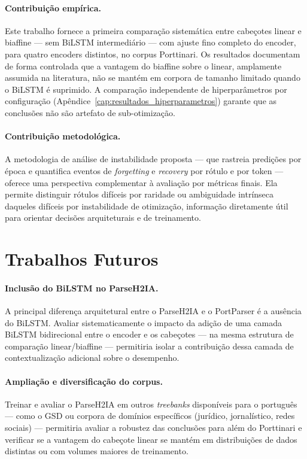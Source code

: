 \paragraph{Contribuição empírica.} Este trabalho fornece a primeira comparação sistemática
entre cabeçotes linear e biaffine — sem BiLSTM intermediário — com ajuste fino completo do
encoder, para quatro encoders distintos, no corpus Porttinari. Os resultados documentam de
forma controlada que a vantagem do biaffine sobre o linear, amplamente assumida na literatura,
não se mantém em corpora de tamanho limitado quando o BiLSTM é suprimido. A comparação
independente de hiperparâmetros por configuração (Apêndice~\ref{cap:resultados_hiperparametros})
garante que as conclusões não são artefato de sub-otimização.

\paragraph{Contribuição metodológica.} A metodologia de análise de instabilidade proposta —
que rastreia predições por época e quantifica eventos de \textit{forgetting} e
\textit{recovery} por rótulo e por token — oferece uma perspectiva complementar à avaliação
por métricas finais. Ela permite distinguir rótulos difíceis por raridade ou ambiguidade
intrínseca daqueles difíceis por instabilidade de otimização, informação diretamente útil
para orientar decisões arquiteturais e de treinamento.

\section{Trabalhos Futuros}
\label{sec:trabalhos_futuros}

\paragraph{Inclusão do BiLSTM no ParseH2IA.} A principal diferença arquitetural entre o
ParseH2IA e o PortParser é a ausência do BiLSTM. Avaliar sistematicamente o impacto da
adição de uma camada BiLSTM bidirecional entre o encoder e os cabeçotes — na mesma estrutura
de comparação linear/biaffine — permitiria isolar a contribuição dessa camada de
contextualização adicional sobre o desempenho.

\paragraph{Ampliação e diversificação do corpus.} Treinar e avaliar o ParseH2IA em outros
\textit{treebanks} disponíveis para o português — como o GSD ou corpora de domínios
específicos (jurídico, jornalístico, redes sociais) — permitiria avaliar a robustez das
conclusões para além do Porttinari e verificar se a vantagem do cabeçote linear se mantém
em distribuições de dados distintas ou com volumes maiores de treinamento.

